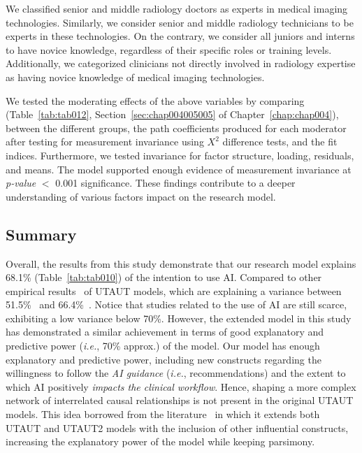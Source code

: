 \textcolor{revised}{We classified senior and middle radiology doctors as experts in medical imaging technologies.
Similarly, we consider senior and middle radiology technicians to be experts in these technologies.
On the contrary, we consider all juniors and interns to have novice knowledge, regardless of their specific roles or training levels.
Additionally, we categorized clinicians not directly involved in radiology expertise as having novice knowledge of medical imaging technologies.}

We tested the moderating effects of the above variables by comparing \textcolor{revised}{(Table~\ref{tab:tab012}, Section~\ref{sec:chap004005005} of Chapter~\ref{chap:chap004})}, between the different groups, the path coefficients produced for each moderator after testing for measurement invariance using $X^2$ difference tests, and the fit indices.
Furthermore, we tested invariance for factor structure, loading, residuals, and means.
The model supported enough evidence of measurement invariance at {\it p-value} $<$ 0.001 significance.
These findings contribute to a deeper understanding of various factors impact on the research model.

\subsection{Summary}
\label{chap:app002004006}

Overall, the results from this study demonstrate that our research model explains 68.1\% (Table~\ref{tab:tab010}) of the intention to use \ac{AI}.
Compared to other empirical results~\cite{LIU2022107026, CALISTO2022102922} of \ac{UTAUT} models, which are explaining a variance between 51.5\%~\cite{LIU2022107026} and 66.4\%~\cite{CALISTO2022102922}.
Notice that studies related to the use of \ac{AI} are still scarce, exhibiting a low variance below 70\%.
However, the extended model in this study has demonstrated a similar achievement in terms of good explanatory and predictive power ({\it i.e.}, 70\% approx.) of the model.
Our model has enough explanatory and predictive power, including new constructs regarding the willingness to follow the {\it AI guidance} ({\it i.e.}, recommendations) and the extent to which \ac{AI} positively {\it impacts the clinical workflow}.
Hence, shaping a more complex network of interrelated causal relationships is not present in the original \ac{UTAUT} models.
This idea borrowed from the literature~\cite{KHALILZADEH2017460, SIGERSON201887} in which it extends both \ac{UTAUT} and \ac{UTAUT}2 models with the inclusion of other influential constructs, increasing the explanatory power of the model while keeping parsimony.

